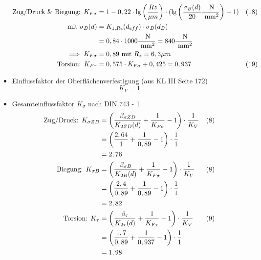 \begin{itemize}
	\begin{align*}
	\text{Zug/Druck \& Biegung: } K_{F\sigma} &= 1 - 0,22 \cdot \lg \left( \frac{Rz}{\mu m}\right) \cdot ( \lg \left( \frac{\sigma_B (d)}{20}\frac{\text{ N}}{\text{ mm}^2}\right) -1 ) &(18) \\
	\text{mit } \sigma_B (d) &= K_{1,Re} (d_{eff}) \cdot \sigma_B (d_B) \\
	&= 0,84 \cdot 1000\frac{\text{ N}}{\text{ mm}^2} = 840 \frac{\text{ N}}{\text{ mm}^2} \\
	\implies K_{F\sigma} &= 0,89 \text{ mit } R_z = 6,3 \mu m\\
	\text{Torsion: } K_{F\tau} &= 0,575 \cdot K_{F\sigma} +0,425 = 0,937 & (19) 
	\end{align*}
	\item Einflussfaktor der Oberflächenverfestigung (aus KL III  Seite 172)
	\[
	K_{V} = 1
	\]
	\item Gesamteinflussfaktor $K_{\sigma}$ nach DIN 743 - 1
	\begin{align*}
	\text{Zug/Druck: } K_{\sigma ZD} &= \left( \frac{\beta_{\sigma ZD}}{K_{2ZD} (d)} + \frac{1}{K_{F\sigma}} -1\right) \cdot \frac{1}{K_V} & (8) \\
	&= \left( \frac{2,64}{1} + \frac{1}{0,89} -1\right) \cdot \frac{1}{1} \\
	&= 2,76 \\
	\text{Biegung: } K_{\sigma B} &= \left( \frac{\beta_{\sigma B}}{K_{2B}(d)} + \frac{1}{K_{F\sigma}} -1\right) \cdot \frac{1}{K_V} & (8) \\
	&= \left( \frac{2,4}{0,89} + \frac{1}{0,89} -1\right) \cdot \frac{1}{1} \\
	&= 2,82 \\
	\text{Torsion: } K_{\tau} &= \left( \frac{\beta_{\tau}}{K_{2\tau}(d)} + \frac{1}{K_{F\tau}} -1\right) \cdot \frac{1}{K_V} & (9) \\
	&= \left( \frac{1,7}{0,89} + \frac{1}{0,937} -1\right) \cdot \frac{1}{1} \\
	&= 1,98 
	\end{align*}
\end{itemize}
